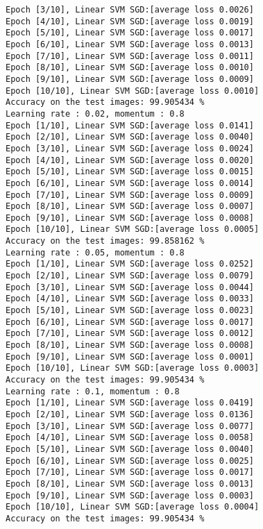 \documentclass[10pt]{article}
\newcommand{\0}{{\mathbf{0}}}
\newcommand{\1}{{\mathbf{1}}}
\begin{document}
\begin{verbatim}
Epoch [3/10], Linear SVM SGD:[average loss 0.0026]
Epoch [4/10], Linear SVM SGD:[average loss 0.0019]
Epoch [5/10], Linear SVM SGD:[average loss 0.0017]
Epoch [6/10], Linear SVM SGD:[average loss 0.0013]
Epoch [7/10], Linear SVM SGD:[average loss 0.0011]
Epoch [8/10], Linear SVM SGD:[average loss 0.0010]
Epoch [9/10], Linear SVM SGD:[average loss 0.0009]
Epoch [10/10], Linear SVM SGD:[average loss 0.0010]
Accuracy on the test images: 99.905434 %
Learning rate : 0.02, momentum : 0.8
Epoch [1/10], Linear SVM SGD:[average loss 0.0141]
Epoch [2/10], Linear SVM SGD:[average loss 0.0040]
Epoch [3/10], Linear SVM SGD:[average loss 0.0024]
Epoch [4/10], Linear SVM SGD:[average loss 0.0020]
Epoch [5/10], Linear SVM SGD:[average loss 0.0015]
Epoch [6/10], Linear SVM SGD:[average loss 0.0014]
Epoch [7/10], Linear SVM SGD:[average loss 0.0009]
Epoch [8/10], Linear SVM SGD:[average loss 0.0007]
Epoch [9/10], Linear SVM SGD:[average loss 0.0008]
Epoch [10/10], Linear SVM SGD:[average loss 0.0005]
Accuracy on the test images: 99.858162 %
Learning rate : 0.05, momentum : 0.8
Epoch [1/10], Linear SVM SGD:[average loss 0.0252]
Epoch [2/10], Linear SVM SGD:[average loss 0.0079]
Epoch [3/10], Linear SVM SGD:[average loss 0.0044]
Epoch [4/10], Linear SVM SGD:[average loss 0.0033]
Epoch [5/10], Linear SVM SGD:[average loss 0.0023]
Epoch [6/10], Linear SVM SGD:[average loss 0.0017]
Epoch [7/10], Linear SVM SGD:[average loss 0.0012]
Epoch [8/10], Linear SVM SGD:[average loss 0.0008]
Epoch [9/10], Linear SVM SGD:[average loss 0.0001]
Epoch [10/10], Linear SVM SGD:[average loss 0.0003]
Accuracy on the test images: 99.905434 %
Learning rate : 0.1, momentum : 0.8
Epoch [1/10], Linear SVM SGD:[average loss 0.0419]
Epoch [2/10], Linear SVM SGD:[average loss 0.0136]
Epoch [3/10], Linear SVM SGD:[average loss 0.0077]
Epoch [4/10], Linear SVM SGD:[average loss 0.0058]
Epoch [5/10], Linear SVM SGD:[average loss 0.0040]
Epoch [6/10], Linear SVM SGD:[average loss 0.0025]
Epoch [7/10], Linear SVM SGD:[average loss 0.0017]
Epoch [8/10], Linear SVM SGD:[average loss 0.0013]
Epoch [9/10], Linear SVM SGD:[average loss 0.0003]
Epoch [10/10], Linear SVM SGD:[average loss 0.0004]
Accuracy on the test images: 99.905434 %
\end{verbatim}
\end{document}
